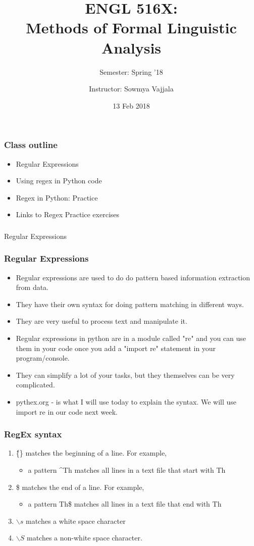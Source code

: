 \documentclass{beamer}
\author[Sowmya Vajjala]{Instructor: Sowmya Vajjala}
\title[ENGL 516X]{ENGL 516X: \\ Methods of Formal Linguistic Analysis}
\subtitle{Semester: Spring '18}
\date{13 Feb 2018}
\institute{Iowa State University, USA}
\begin{document}
\begin{frame}\titlepage
\end{frame}

\begin{frame}%
\frametitle{Class outline}
\begin{itemize}
\item Regular Expressions
\item Using regex in Python code
\item Regex in Python: Practice
\item Links to Regex Practice exercises
\end{itemize}
\end{frame}

\begin{frame}
\frametitle{}
\centering
\Large Regular Expressions
\end{frame}

\begin{frame}
\frametitle{Regular Expressions}
\begin{itemize}
\item Regular expressions are used to do do pattern based information extraction from data. 
\item They have their own syntax for doing pattern matching in different ways.
\item They are very useful to process text and manipulate it.
\item Regular expressions in python are in a module called "re" and you can use them in your code once you add a "import re" statement in your program/console.
\item They can simplify a lot of your tasks, but they themselves can be very complicated.
\item pythex.org - is what I will use today to explain the syntax. We will use import re in our code next week.
\end{itemize}
\end{frame}

\begin{frame}
\frametitle{RegEx syntax}
\begin{enumerate}
\item \^\{\} matches the beginning of a line. For example,
\begin{itemize}
\item a pattern \^{}Th matches all lines in a text file that start with Th
\end{itemize}
\item \$ matches the end of a line. For example,
\begin{itemize}
\item a pattern Th\$ matches all lines in a text file that end with Th
\end{itemize}
\item $\backslash s$ matches a white space character
\item $\backslash S$  matches a non-white space character.
\end{enumerate}
\end{frame}
\end{document}
